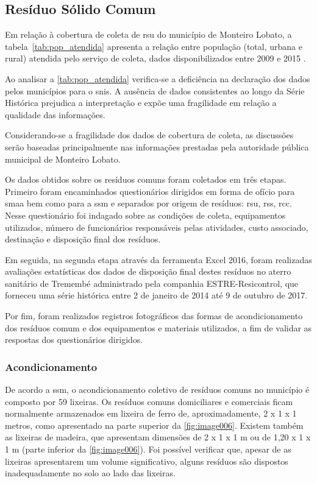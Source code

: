\subsection{Resíduo Sólido Comum}

Em relação à cobertura de coleta de \gls{rsu} do município de Monteiro Lobato, a tabela~\ref{tab:pop_atendida} apresenta a relação entre população (total, urbana e rural) atendida pelo serviço de coleta, dados disponibilizados entre 2009 e 2015 \cite{SNIS2016}.



Ao analisar a \autoref{tab:pop_atendida} verifica-se a deficiência na declaração dos dados pelos municípios para o \gls{snis}. A ausência de dados consistentes ao longo da Série Histórica prejudica a interpretação e expõe uma fragilidade em relação a qualidade das informações.

Considerando-se a fragilidade dos dados de cobertura de coleta, as discussões serão baseadas principalmente nas informações prestadas pela autoridade pública municipal de Monteiro Lobato.

Os dados obtidos sobre os resíduos comuns foram coletados em três etapas. Primeiro foram encaminhados questionários dirigidos em forma de ofício para \gls{smaa} bem como para a \gls{ssm} e separados por origem de resíduos: \gls{rsu}, \gls{rss}, \gls{rcc}. Nesse questionário foi indagado sobre as condições de coleta, equipamentos utilizados, número de funcionários responsáveis pelas atividades, custo associado, destinação e disposição final dos resíduos.

Em seguida, na segunda etapa através da ferramenta Excel 2016, foram realizadas avaliações estatísticas dos dados de disposição final destes resíduos no aterro sanitário de Tremembé administrado pela companhia ESTRE-Resicontrol, que forneceu uma série histórica entre 2 de janeiro de 2014 até 9 de outubro de 2017.

Por fim, foram realizados registros fotográficos das formas de acondicionamento dos resíduos comum e dos equipamentos e materiais utilizados, a fim de validar as respostas dos questionários dirigidos.

\subsubsection{Acondicionamento}

De acordo a \gls{ssm}, o acondicionamento coletivo de resíduos comuns no município é composto por 59 lixeiras. Os resíduos comuns domiciliares e comerciais ficam normalmente armazenados em lixeira de ferro de, aproximadamente, 2 x 1 x 1 metros, como apresentado na parte superior da \autoref{fig:image006}. Existem também as lixeiras de madeira, que apresentam dimensões de 2 x 1 x 1 m ou de 1,20 x 1 x 1 m (parte inferior da \autoref{fig:image006}). Foi possível verificar que, apesar de as lixeiras apresentarem um volume significativo, alguns resíduos são dispostos inadequadamente no solo ao lado das lixeiras. 

